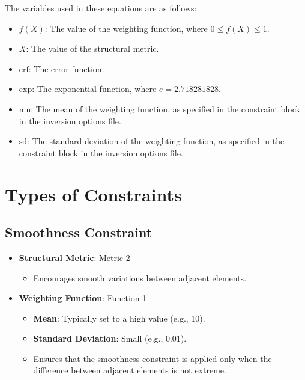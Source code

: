 \documentclass[a4paper,12pt]{article}
\begin{document}
The variables used in these equations are as follows:

\begin{itemize}
    \item \(f(X)\): The value of the weighting function, where \(0 \leq f(X) \leq 1\).
    \item \(X\): The value of the structural metric.
    \item \(\text{erf}\): The error function.
    \item \(\text{exp}\): The exponential function, where \(e = 2.718281828\).
    \item \(\text{mn}\): The mean of the weighting function, as specified in the constraint block in the inversion options file.
    \item \(\text{sd}\): The standard deviation of the weighting function, as specified in the constraint block in the inversion options file.
\end{itemize}

\section{Types of Constraints}

\subsection{Smoothness Constraint}
\begin{itemize}
    \item \textbf{Structural Metric}: Metric 2
          \begin{itemize}
              \item Encourages smooth variations between adjacent elements.
          \end{itemize}
    \item \textbf{Weighting Function}: Function 1
          \begin{itemize}
              \item \textbf{Mean}: Typically set to a high value (e.g., 10).
              \item \textbf{Standard Deviation}: Small (e.g., 0.01).
              \item Ensures that the smoothness constraint is applied only when the difference
                    between adjacent elements is not extreme.
          \end{itemize}
\end{itemize}
\end{document}
